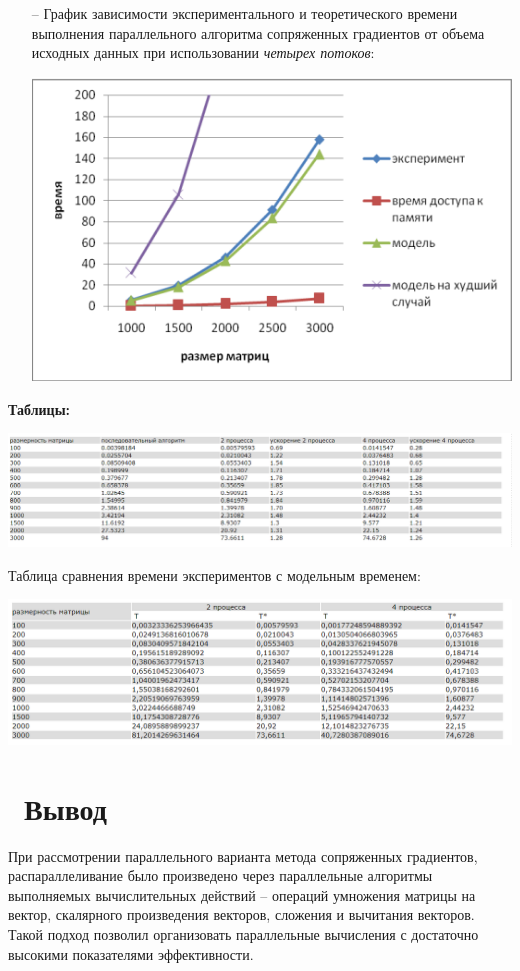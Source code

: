 \documentclass[12pt]{article}
\begin{document}
\begin{itemize}
\begin{center}
	\end{center}
	\item [--]График зависимости экспериментального и теоретического времени выполнения параллельного алгоритма сопряженных градиентов от объема исходных данных при использовании \emph{четырех потоков}: 
	\begin{center}
	\includegraphics[width=\textwidth]{gra3}
	\end{center}
\end{itemize}

\textbf{Таблицы: }


\begin{center}
\includegraphics[width=1.2\textwidth]{table1}
\end{center}
Таблица сравнения времени экспериментов с модельным временем:
\begin{center}
\includegraphics[width=1.2\textwidth]{table2}
\end{center}

\section{\ Вывод}
При рассмотрении параллельного варианта метода сопряженных градиентов, распараллеливание было произведено через параллельные алгоритмы выполняемых вычислительных действий – операций умножения матрицы на вектор, скалярного произведения векторов, сложения и вычитания векторов.
Такой подход позволил организовать параллельные вычисления с достаточно высокими показателями эффективности.
\end{document}
